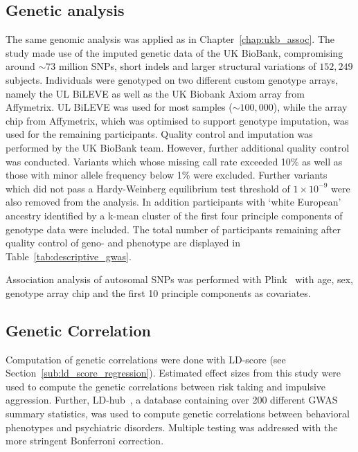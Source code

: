 \subsection{Genetic analysis}
\label{sub:genetic_analysis}

The same genomic analysis was applied as in Chapter~\ref{chap:ukb_assoc}.
The study made use of the imputed genetic data of the UK BioBank, compromising around $\sim73$ million SNPs, short indels and larger structural variations of $152,249$ subjects.
Individuals were genotyped on two different custom genotype arrays, namely the UL BiLEVE as well as the UK Biobank Axiom array from Affymetrix. 
UL BiLEVE was used for most samples ($\sim100,000$), while the array chip from Affymetrix, which was optimised to support genotype imputation, was used for the remaining participants. 
Quality control and imputation was performed by the UK BioBank team.
However, further additional quality control was conducted.
Variants which whose missing call rate exceeded 10\% as well as those with minor allele frequency below 1\% were excluded.
Further variants which did not pass a Hardy-Weinberg equilibrium test threshold of $1\times10^{-9}$ were also removed from the analysis.
In addition participants with `white European' ancestry identified by a k-mean cluster of the first four principle components of genotype data were included.
The total number of participants remaining after quality control of geno- and phenotype are displayed in Table~\ref{tab:descriptive_gwas}.

Association analysis of autosomal SNPs was performed with Plink~\cite{Purcell2007,Chang2015} with age, sex, genotype array chip and the first 10 principle components as covariates.

\subsection{Genetic Correlation}
\label{sub:genetic_correlation}

Computation of genetic correlations were done with LD-score (see Section~\ref{sub:ld_score_regression}).
Estimated effect sizes from this study were used to compute the genetic correlations between risk taking and impulsive aggression.
Further, LD-hub~\cite{ZHENG2016}, a database containing over 200 different GWAS summary statistics, was used to compute genetic correlations between behavioral phenotypes and psychiatric disorders.
Multiple testing was addressed with the more stringent Bonferroni correction.

